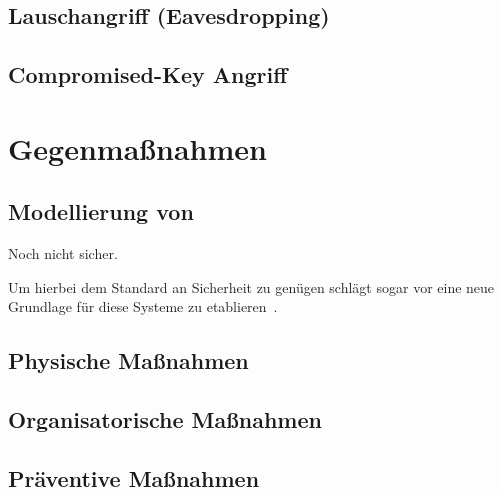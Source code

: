 \documentclass[final,bibliography=totocnumbered]{include/sikseminar}
\begin{document}
\subsection{Lauschangriff (Eavesdropping)}\label{subsec:lauschen} %
\subsection{Compromised-Key Angriff}\label{subsec:key}


\section{Gegenmaßnahmen}\label{sec:gegenmassnahmen}




\subsection{Modellierung von }\label{subsec:modellierung}
Noch nicht sicher.

Um hierbei dem Standard an Sicherheit zu genügen schlägt \citeauthor{Lee08} sogar vor eine neue Grundlage für diese Systeme zu etablieren~\cite{Lee08}.

\subsection{Physische Maßnahmen}\label{subsec:physisch}

\subsection{Organisatorische Maßnahmen}\label{subsec:orga}

\subsection{Präventive Maßnahmen}\label{subsec:präventiv}
\end{document}

